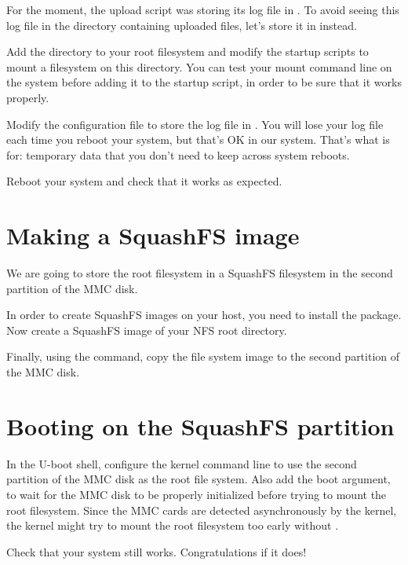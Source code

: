 For the moment, the upload script was storing its log file in
. To avoid seeing this log file in
the directory containing uploaded files, let's store it in
 instead.

Add the  directory to your root filesystem and modify
the startup scripts to mount a  filesystem on this
directory. You can test your  mount command line on the
system before adding it to the startup script, in order to be sure
that it works properly.

Modify the  configuration file to store
the log file in . You will lose your log
file each time you reboot your system, but that's OK in our
system. That's what  is for: temporary data that you don't need
to keep across system reboots.

Reboot your system and check that it works as expected.

\section{Making a SquashFS image}

We are going to store the root filesystem in a SquashFS filesystem in
the second partition of the MMC disk.

In order to create SquashFS images on your host, you need to install
the  package. Now create a SquashFS image of your
NFS root directory.

Finally, using the  command, copy the file system image to
the second partition of the MMC disk.

\section{Booting on the SquashFS partition}

In the U-boot shell, configure the kernel command line to use the
second partition of the MMC disk as the root file system. Also add the
 boot argument, to wait for the MMC disk to be properly
initialized before trying to mount the root filesystem. Since the MMC
cards are detected asynchronously by the kernel, the kernel might try
to mount the root filesystem too early without .

Check that your system still works. Congratulations if it does!

